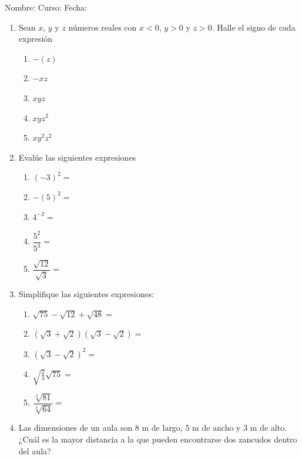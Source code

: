 \documentclass[fleqn]{article}
\newcommand{\LineaNombre}{%
\par
\vspace{\baselineskip}
Nombre:\hrulefill \; Curso: \underline{\hspace*{48pt}} \; Fecha: \underline{\hspace*{2.5cm}} \relax
\par}
\begin{document}
\LineaNombre
\begin{enumerate}
 \item Sean $x$, $y$ y $z$ números reales con $x<0$, $y>0$ y $z>0$. Halle el signo de cada expresión
 \begin{enumerate}
 \item $-(z)$
 \item $-xz$
 \item $xyz$
 \item $xyz^{2}$
 \item $xy^{2}z^{2}$
 \end{enumerate}
 \item Evalúe las siguientes expresiones
 \begin{enumerate}
 \item $(-3)^{2}=$\noanswer
 \item $-(5)^{2}=$\noanswer
 \item $4^{-2}=$\noanswer
 \item $\dfrac{5^{2}}{5^{3}}=$\noanswer
 \item $\dfrac{\sqrt{12}}{\sqrt{3}}=$\noanswer
 \end{enumerate}
 \item Simplifique las siguientes expresiones:
 \begin{enumerate}
 \item $\sqrt{75}-\sqrt{12}+\sqrt{48}=$\vspace*{20pt}
 \item $(\sqrt{3}+\sqrt{2})(\sqrt{3}-\sqrt{2})=$\vspace*{20pt}
 \item $(\sqrt{3}-\sqrt{2})^{2}=$\vspace*{20pt}
 \item $\sqrt{\frac{2}{3}}\sqrt{75}=$ \vspace*{20pt}
 \newpage
 \item $\dfrac{\sqrt[3]{81}}{\sqrt[3]{64}}=$\vspace*{20pt}
 \end{enumerate}
 \item Las dimensiones de un aula son 8 m de largo, 5 m de ancho y 3 m de alto. ¿Cuál es la mayor distancia a la que pueden encontrarse dos zancudos dentro del aula?\noanswer

\end{enumerate}
\end{document}
